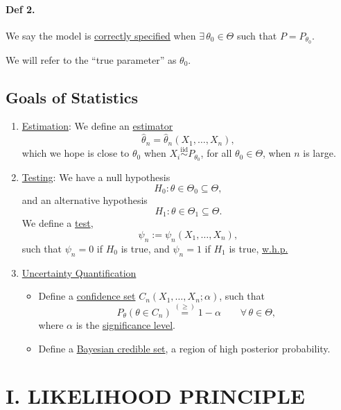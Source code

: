 \documentclass[11pt,a4paper]{article}
\begin{document}
\paragraph{Def 2.}
We say the model is \underline{correctly specified} when
$\exists\,\theta_0\in\Theta$ such that $P=P_{\theta_0}$.

We will refer to the ``true parameter'' as $\theta_0$.

\subsection*{Goals of Statistics}

\begin{enumerate}
    \item \underline{Estimation}:
    We define an \underline{estimator}
    \[
    \widehat{\theta}_n
    =
    \widehat{\theta}_n(X_1,\ldots,X_n),
    \]
    which we hope is close to $\theta_0$ when
    $X_i\overset{\mathrm{iid}}{\sim}P_{\theta_0}$,
    for all $\theta_0\in\Theta$, when $n$ is large.

    \item \underline{Testing}:
    We have a null hypothesis
    \[
    H_0:\theta\in\Theta_0\subseteq\Theta,
    \]
    and an alternative hypothesis
    \[
    H_1:\theta\in\Theta_1\subseteq\Theta.
    \]
    We define a \underline{test},
    \[
    \psi_n:=\psi_n(X_1,\ldots,X_n),
    \]
    such that $\psi_n=0$ if $H_0$ is true, and
    $\psi_n=1$ if $H_1$ is true, \underline{w.h.p.}

    \item \underline{Uncertainty Quantification}
    \begin{itemize}
        \item Define a \underline{confidence set}
        $C_n(X_1,\ldots,X_n;\alpha)$, such that
        \[
        P_\theta(\theta\in C_n)
        \overset{(\geq)}{=}
        1-\alpha
        \qquad \forall\,\theta\in\Theta,
        \]
        where $\alpha$ is the \underline{significance level}.

        \item Define a \underline{Bayesian credible set},
        a region of high posterior probability.
    \end{itemize}
\end{enumerate}

\section*{I. LIKELIHOOD PRINCIPLE}
\end{document}
